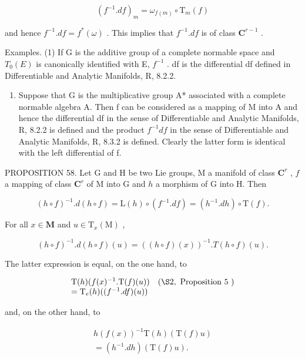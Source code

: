 \[
(f ^ {- 1}. d f) _ {m} = \omega_ {f (m)} \circ \mathrm{T} _ {m} (f)
\]

and hence \(f^{-1}.df = f^{*}(\omega)\) . This implies that \(f^{-1}.df\) is of class \(\mathbf{C}^{r - 1}\) .

Examples. (1) If G is the additive group of a complete normable space and \(T_{0}(E)\) is canonically identified with E, \(f^{-1}\) . df is the differential df defined in Differentiable and Analytic Manifolds, R, 8.2.2.

\begin{enumerate}
\def\labelenumi{(\arabic{enumi})}
\setcounter{enumi}{1}
\tightlist
\item
  Suppose that G is the multiplicative group A* associated with a complete normable algebra A. Then f can be considered as a mapping of M into A and hence the differential df in the sense of Differentiable and Analytic Manifolds, R, 8.2.2 is defined and the product \(f^{-1}df\) in the sense of Differentiable and Analytic Manifolds, R, 8.3.2 is defined. Clearly the latter form is identical with the left differential of f.
\end{enumerate}

PROPOSITION 58. Let G and H be two Lie groups, M a manifold of class \(\mathbf{C}^r\) , \(f\) a mapping of class \(\mathbf{C}^r\) of M into G and \(h\) a morphism of G into H. Then

\[
(h \circ f) ^ {- 1}. d (h \circ f) = \mathrm{L} (h) \circ (f ^ {- 1}. d f) = (h ^ {- 1}. d h) \circ \mathrm{T} (f).
\]

For all \(x \in \mathbf{M}\) and \(u \in \mathrm{T}_x(\mathrm{M})\) ,

\[
(h \circ f) ^ {- 1}. d (h \circ f) (u) = ((h \circ f) (x)) ^ {- 1}. T (h \circ f) (u).
\]

The latter expression is equal, on the one hand, to

\[
\begin{array}{l l} \mathrm{T} (h) (f (x) ^ {- 1}. \mathrm{T} (f) (u)) & (\S 2, \text { Proposition   5 }) \\ = \mathrm{T} _ {e} (h) ((f ^ {- 1}. d f) (u)) \end{array}
\]

and, on the other hand, to

\[
\begin{array}{c} h (f (x)) ^ {- 1} \mathrm{T} (h) (\mathrm{T} (f) u) \\ = (h ^ {- 1}. d h) (\mathrm{T} (f) u). \end{array}
\]


